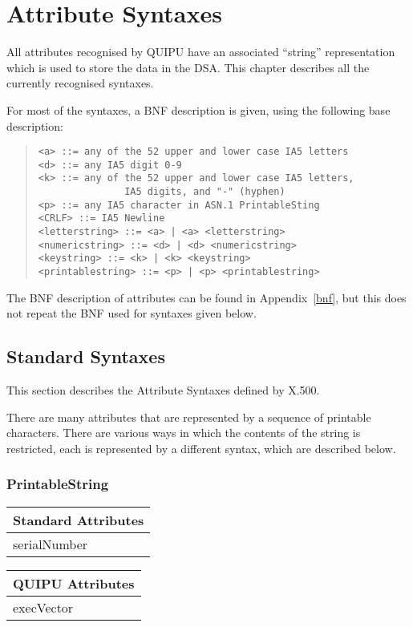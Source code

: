 
\chapter {Attribute Syntaxes}
\label{syntaxes}

All attributes recognised by QUIPU have an associated ``string''
representation which is used to store the data in the DSA.
This chapter describes all the currently recognised syntaxes.

For most of the syntaxes, a BNF description is given, using the following
base description:

\begin{quote}\small\begin{verbatim}
<a> ::= any of the 52 upper and lower case IA5 letters
<d> ::= any IA5 digit 0-9
<k> ::= any of the 52 upper and lower case IA5 letters,
               IA5 digits, and "-" (hyphen)
<p> ::= any IA5 character in ASN.1 PrintableSting
<CRLF> ::= IA5 Newline
<letterstring> ::= <a> | <a> <letterstring>
<numericstring> ::= <d> | <d> <numericstring>
<keystring> ::= <k> | <k> <keystring>
<printablestring> ::= <p> | <p> <printablestring>
\end{verbatim}\end{quote}

The BNF description of attributes can be found in
Appendix~\ref{bnf}, but this does not repeat the BNF used for syntaxes
given below.

\section{Standard Syntaxes}

This section describes the Attribute Syntaxes defined by X.500.

There are many attributes that are represented by a sequence of
printable characters.  There are various ways in which the contents of the
string is restricted, each is represented by a different syntax, which are
described below.

\subsection{PrintableString}

\begin{center}\small
\begin{tabular}{|l|}\hline
Standard Attributes \\ \hline
	serialNumber\\
\hline
\end{tabular}
\begin{tabular}{|l|}\hline
QUIPU Attributes \\ \hline
	execVector\\
\hline
\end{tabular}
\end{center}


